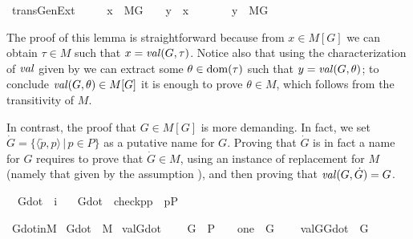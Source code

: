\begin{isabelle}
\isamarkupfalse%
\ trans{\isacharunderscore}Gen{\isacharunderscore}Ext{\isacharprime}\ {\isacharcolon}\isanewline
\ \ \ \ {\isachardoublequoteopen}x\ {\isasymin}\ M{\isacharbrackleft}G{\isacharbrackright}{\isachardoublequoteclose}\ \ \ \ {\isachardoublequoteopen}y\ {\isasymin}\ x{\isachardoublequoteclose}\ \isanewline
\ \ \ \ \ \ {\isachardoublequoteopen}y\ {\isasymin}\ M{\isacharbrackleft}G{\isacharbrackright}{\isachardoublequoteclose}
\end{isabelle}
The proof of this lemma is straightforward because from $x \in M[G]$
we can obtain $\tau \in M$ such that $x = \operatorname{\mathit{val}}(G,\tau)$. Notice also
that using the characterization of $\operatorname{\mathit{val}}$ given by
 we can extract some
$\theta \in \operatorname{dom}(\tau)$ such that $y =\operatorname{\mathit{val}}(G,\theta)$; to conclude
$\operatorname{\mathit{val}}(G,\theta) \in M[G]$ it is enough to prove $\theta \in M$, which
follows from the transitivity of $M$.

In contrast, the proof that $G\in M[G]$ is more demanding. In fact, we
set $\dot{G} = \{ \langle \check{p},p\rangle \,|\, p \in P \}$ as a
putative name for $G$. Proving that $\dot{G}$ is in fact a name for
$G$ requires to prove that $\dot{G} \in M$, using an instance of
replacement for $M$ (\noindent namely that given by the assumption
), and
then proving that $\operatorname{\mathit{val}}(G,\dot{G})=G$.

\begin{isabelle}
\isamarkupfalse%
\isanewline
\ \ G{\isacharunderscore}dot\ {\isacharcolon}{\isacharcolon}\ {\isachardoublequoteopen}i{\isachardoublequoteclose}\ \isanewline
\ \ {\isachardoublequoteopen}G{\isacharunderscore}dot\ {\isacharequal}{\isacharequal}\ {\isacharbraceleft}{\isacharless}check{\isacharparenleft}p{\isacharparenright}{\isacharcomma}p{\isachargreater}\ {\isachardot}\ p{\isasymin}P{\isacharbraceright}{\isachardoublequoteclose}
\end{isabelle}

\begin{isabelle}
\isamarkupfalse%
\ G{\isacharunderscore}dot{\isacharunderscore}in{\isacharunderscore}M\ {\isacharcolon} {\isachardoublequoteopen}G{\isacharunderscore}dot\ {\isasymin}\ M{\isachardoublequoteclose}
\isanewline\isanewline
{}\isamarkupfalse%
\ val{\isacharunderscore}G{\isacharunderscore}dot\ {\isacharcolon}\isanewline
\ \ \ {\isachardoublequoteopen}G\ {\isasymsubseteq}\ P{\isachardoublequoteclose}\ \ \ \ 
{\isachardoublequoteopen}one\ {\isasymin}\ G{\isachardoublequoteclose}\ \isanewline
\ \ \isakeyword{shows}\ {\isachardoublequoteopen}val{\isacharparenleft}G{\isacharcomma}G{\isacharunderscore}dot{\isacharparenright}\ {\isacharequal}\ G{\isachardoublequoteclose}
\end{isabelle}


